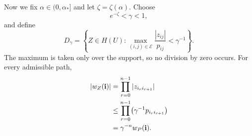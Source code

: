 \documentclass[11pt,a4paper]{amsart}
\newtheorem{lemma}[theorem]{Lemma}
\newcommand{\cE}{\mathcal E}
\newcommand{\cB}{\mathcal B}
\newcommand{\norm}[1]{\left\lVert #1\right\rVert}
\begin{document}

%

Now we fix \(\alpha\in(0,\alpha_*]\) and let 
\(\zeta=\zeta(\alpha)\).  Choose
\[
 e^{-\zeta}<\gamma<1,
\]
and define
\[
 D_\gamma
 =\left\{Z\in H(U):
       \max_{(i,j)\in\cE}\frac{|z_{ij}|}{p_{ij}}
       <\gamma^{-1}\right\}.
\]
The maximum is taken only over the support, so no division by zero
occurs.  For every admissible path,
\begin{align}
 |w_Z(\mathbf i)|
 &=\prod_{r=0}^{n-1}|z_{i_ri_{r+1}}|\notag\\
 &\le
 \prod_{r=0}^{n-1}
 \bigl(\gamma^{-1}p_{i_ri_{r+1}}\bigr)\notag\\
 &=\gamma^{-n}w_P(\mathbf i).
\label{eq:path-comparison}
\end{align}
\end{document}
